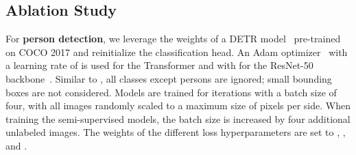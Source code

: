 \documentclass[sigconf]{acmart}
\begin{document}
\subsection{Ablation Study}
\label{chp:ablation}

\label{chp:exp_boxes}
For \textbf{person detection}, we leverage the weights of a \ac{DETR} model~\cite{DBLP:conf/eccv/CarionMSUKZ20} pre-trained on COCO 2017 and reinitialize the classification head. 
An Adam optimizer~\cite{DBLP:journals/corr/KingmaB14} with a learning rate of  is used for the Transformer and with  for the ResNet-50 backbone~\cite{DBLP:conf/cvpr/HeZRS16}. Similar to \citet{DBLP:conf/cvpr/0012WZXXT21}, all classes except persons are ignored; small bounding boxes are not considered. 
Models are trained for  iterations with a batch size of four, with all images randomly scaled to a maximum size of  pixels per side. When training the semi-supervised models, the batch size is increased by four additional unlabeled images. 
The weights of the different loss hyperparameters are set to , , and .
\end{document}
